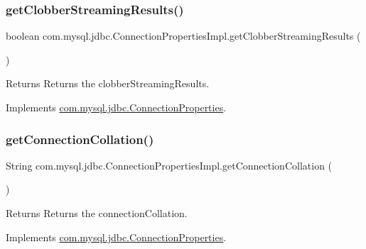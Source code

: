 \subsubsection{\texorpdfstring{get\+Clobber\+Streaming\+Results()}{getClobberStreamingResults()}}
{\footnotesize\ttfamily boolean com.\+mysql.\+jdbc.\+Connection\+Properties\+Impl.\+get\+Clobber\+Streaming\+Results (\begin{DoxyParamCaption}{ }\end{DoxyParamCaption})}

\begin{DoxyReturn}{Returns}
Returns the clobber\+Streaming\+Results. 
\end{DoxyReturn}


Implements \mbox{\hyperlink{interfacecom_1_1mysql_1_1jdbc_1_1_connection_properties_a8097aba9e8a5a513b9dec2c4bfb04fd2}{com.\+mysql.\+jdbc.\+Connection\+Properties}}.

\mbox{\label{classcom_1_1mysql_1_1jdbc_1_1_connection_properties_impl_a141bde8aef1acf397baaa8d9e5e65f51}} 
\subsubsection{\texorpdfstring{get\+Connection\+Collation()}{getConnectionCollation()}}
{\footnotesize\ttfamily String com.\+mysql.\+jdbc.\+Connection\+Properties\+Impl.\+get\+Connection\+Collation (\begin{DoxyParamCaption}{ }\end{DoxyParamCaption})}

\begin{DoxyReturn}{Returns}
Returns the connection\+Collation. 
\end{DoxyReturn}


Implements \mbox{\hyperlink{interfacecom_1_1mysql_1_1jdbc_1_1_connection_properties_ad1204db6592b3e0cfa702d4f6abed586}{com.\+mysql.\+jdbc.\+Connection\+Properties}}.

\mbox{\label{classcom_1_1mysql_1_1jdbc_1_1_connection_properties_impl_af9fafd545458cac3d1e23e6ff2717a5e}} 
